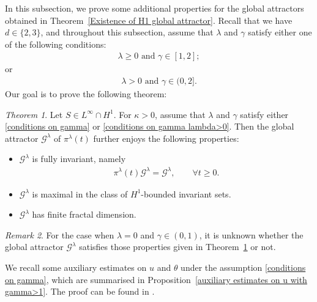 \documentclass[reqno]{amsart}%
\theoremstyle{definition}
\theoremstyle{remark}
\numberwithin{equation}{section}
\newtheorem{theorem}{Theorem}
\newtheorem{remark}[theorem]{Remark}
\newcommand{\1}{\mathbf{1}}
\newcommand{\Gg}{\mathcal{G}^{\lambda}}
\newcommand{\pin}{\pi^{\lambda}}
\numberwithin{equation}{section}
\numberwithin{theorem}{section}
\numberwithin{figure}{section}
\begin{document}
In this subsection, we prove some additional properties for the global attractors obtained in Theorem~\ref{Existence of H1 global attractor}. Recall that we have $d\in\{2,3\}$, and throughout this subsection, assume that $\lambda$ and $\gamma$ satisfy either one of the following conditions:
\begin{align}\label{conditions on gamma}
\mbox{$\lambda\ge0$ and $\gamma\in[1,2]$};
\end{align}
or
\begin{align}\label{conditions on gamma lambda>0}
\mbox{$\lambda>0$ and $\gamma\in(0,2]$}.
\end{align}
Our goal is to prove the following theorem: 
\begin{theorem}\label{Existence of H1 global attractor further properties thm}
Let $S\in L^\infty\cap H^1$. For $\kappa>0$, assume that $\lambda$ and $\gamma$ satisfy either \eqref{conditions on gamma} or \eqref{conditions on gamma lambda>0}. Then the global attractor $\Gg$ of $\pin(t)$ further enjoys the following properties:
\begin{itemize}
\item $\Gg$ is fully invariant, namely
\begin{align*}
\pin(t)\Gg=\Gg,\qquad \forall t\ge0.
\end{align*}
\item $\Gg$ is maximal in the class of $H^1$-bounded invariant sets.
\item $\Gg$ has finite fractal dimension.
\end{itemize}
\end{theorem}

\begin{remark}
For the case when $\lambda=0$ and $\gamma\in(0,1)$, it is unknown whether the global attractor $\Gg$ satisfies those properties given in Theorem~\ref{Existence of H1 global attractor further properties thm} or not. 
\end{remark}

We recall some auxiliary estimates on $u$ and $\theta$ under the assumption \eqref{conditions on gamma}, which are summarised in Proposition~\ref{auxiliary estimates on u with gamma>1}. The proof can be found in \cite{FS21}.
\end{document}
